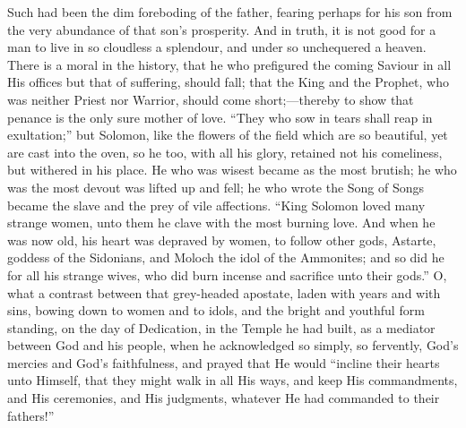 Such had been the dim foreboding of the father, fearing perhaps for
his son from the very abundance of that son's prosperity. And in
truth, it is not good for a man to live in so cloudless a splendour,
and under so unchequered a heaven. There is a moral in the history,
that he who prefigured the coming Saviour in all His offices but that
of suffering, should fall; that the King and the Prophet, who was
neither Priest nor Warrior, should come short;—thereby to show that
penance is the only sure mother of love. ``They who sow in tears
shall reap in exultation;'' but Solomon, like the flowers of the
field which are so beautiful, yet are cast into the oven, so he too,
with all his glory, retained not his comeliness, but withered in his
place. He who was wisest became as the most brutish; he who was the
most devout was lifted up and fell; he who wrote the Song of Songs
became the slave and the prey of vile affections. ``King Solomon
loved many strange women, unto them he clave with the most burning
love. And when he was now old, his heart was depraved by women, to
follow other gods, Astarte, goddess of the Sidonians, and Moloch the
idol of the Ammonites; and so did he for all his strange wives, who
did burn incense and sacrifice unto their gods.'' O, what a
contrast between that grey-headed apostate, laden with years and with
sins, bowing down to women and to idols, and the bright and youthful
form standing, on the day of Dedication, in the Temple he had built,
as a mediator between God and his people, when he acknowledged so
simply, so fervently, God's mercies and God's faithfulness, and prayed
that He would ``incline their hearts unto Himself, that they might
walk in all His ways, and keep His commandments, and His ceremonies,
and His judgments, whatever He had commanded to their fathers!''

